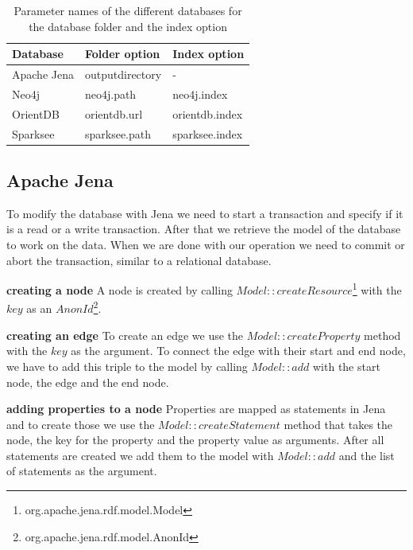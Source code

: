 \begin{table}
  \begin{minipage}{\textwidth}
    \begin{tabularx}{\textwidth}{ | X | X | X | }
      \hline
      Database & Folder option & Index option \\ \hline \hline
      Apache Jena & outputdirectory & - \\ \hline
      Neo4j & neo4j.path & neo4j.index \\ \hline
      OrientDB & orientdb.url & orientdb.index \\ \hline
      Sparksee & sparksee.path & sparksee.index \\ \hline
    \end{tabularx}
  \end{minipage}
  \caption{Parameter names of the different databases for the database folder and the index option}
  \label{tab:bindingParameterMapping}
\end{table}

\subsection{Apache Jena}
To modify the database with Jena we need to start a transaction and specify if it is a read or a write transaction.
After that we retrieve the model of the database to work on the data.
When we are done with our operation we need to commit or abort the transaction,
similar to a relational database.

\textbf{creating a node} \newline
A node is created by calling $ Model::createResource $\footnote{org.apache.jena.rdf.model.Model} with the $ key $ as an $ AnonId $\footnote{org.apache.jena.rdf.model.AnonId}.

\textbf{creating an edge} \newline
To create an edge we use the $ Model::createProperty $ method with the $ key $ as the argument.
To connect the edge with their start and end node,
we have to add this triple to the model by calling $ Model::add $ with the start node,
the edge and the end node.

\textbf{adding properties to a node} \newline
Properties are mapped as statements in Jena and to create those we use the $ Model::createStatement $ method that takes the node, the key for the property and the property value as arguments.
After all statements are created we add them to the model with $ Model::add $ and the list of statements as the argument.

